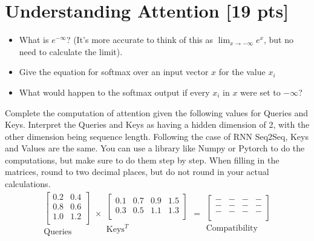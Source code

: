 \documentclass[11pt]{article}
\begin{document}
\section{Understanding Attention [19 pts]}

\begin{itemize}
  \item What is $e^{-\infty}$? (It's more accurate to think of this as $\lim_{x \to -\infty} e^x$, but no need to calculate the limit).
  \item Give the equation for softmax over an input vector $x$ for the value $x_i$
  \item What would happen to the softmax output if every $x_i$ in $x$ were set to $-\infty$?
\end{itemize}


\vspace{2em}
 Complete the computation of attention given the following values for Queries and Keys. Interpret the Queries and Keys as having a hidden dimension of 2, with the other dimension being sequence length. Following the case of RNN Seq2Seq, Keys and Values are the same. You can use a library like Numpy or Pytorch to do the computations, but make sure to do them step by step. When filling in the matrices, round to two decimal places, but do not round in your actual calculations.
\[
\begin{array}{c}
\begin{bmatrix}
0.2 & 0.4 \\
0.8 & 0.6 \\
1.0 & 1.2 \\
\end{bmatrix}\\
\text{Queries}
\end{array}
\times
\begin{array}{c}
\begin{bmatrix}
0.1 & 0.7 & 0.9 & 1.5\\
0.3 & 0.5 & 1.1 & 1.3\\
\end{bmatrix}\\
\text{Keys}^T
\end{array}
=
\begin{array}{c}
\begin{bmatrix}
- & - & - & - \\
- & - & - & - \\
- & - & - & - \\
\end{bmatrix}\\
\text{Compatibility}
\end{array}
\]
\end{document}
